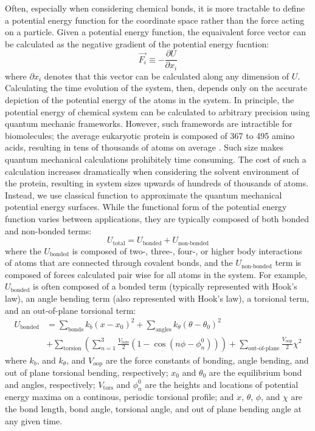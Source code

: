 Often, especially when considering chemical bonds, it is more tractable to define a potential energy function for the coordinate space rather than the force acting on a particle. 
Given a potential energy function, the equaivalent force vector can be calculated as the negative gradient of the potential energy fucntion: 
\begin{equation} 
    \vec{F_i} \equiv -\frac{\partial U}{\partial x_i}
\end{equation}
where $\partial x_i$ denotes that this vector can be calculated along any dimension of $U$. 
Calculating the time evolution of the system, then, depends only on the accurate depiction of the potential energy of the atoms in the system. 
In principle, the potential energy of chemical system can be calculated to arbitrary precision using quantum mechanic frameworks. 
However, such framewords are intractible for biomolecules; the average eukaryotic protein is composed of 367 to 495 amino acids, resulting in tens of thousands of atoms on average \cite{Kozlowski2017}. 
Such size makes quantum mechanical calculations prohibitely time consuming. 
The cost of such a calculation increases dramatically when considering the solvent environment of the protein, resulting in system sizes upwards of hundreds of thousands of atoms. 
Instead, we use classical function to approximate the quantum mechanical potential energy surfaces. 
While the functional form of the potential energy function varies between applications, they are typically composed of both bonded and non-bonded terms: 
\begin{equation}
    U_{\text{total}} = U_{\text{bonded}} + U_{\text{non-bonded}}
\end{equation}
where the $U_{\text{bonded}}$ is composed of two-, three-, four-, or higher body interactions of atoms that are connected through covalent bonds, and the $U_{\text{non-bonded}}$ term is composed of forces calculated pair wise for all atoms in the system. 
For example, $U_{\text{bonded}}$ is often composed of a bonded term (typically represented with Hook's law), an angle bending term (also represented with Hook's law), a torsional term, and an out-of-plane torsional term: 
\begin{equation}
    \begin{split}
        U_{\text{bonded}} &= \sum_{\text{bonds}} k_b(x-x_0)^2 + \sum_{\text{angles}} k_\theta (\theta - \theta_0)^2 \\
        &+ \sum_{\text{torsion}} \left ( \sum_{n = 1}^3 \frac{V_\text{tors}}{2} (1 - \cos (n \phi - \phi_n^0) ) \right ) + \sum_{\text{out-of-plane}} \frac{V_\text{oop}}{2} \chi^2
    \end{split}
    \label{eq:intro-bond}
\end{equation}
where $k_b$, and $k_\theta$, and $V_\text{oop}$ are the force constants of bonding, angle bending, and out of plane torsional bending, respectively; 
$x_0$ and $\theta_0$ are the equilibrium bond and angles, respectively; 
$V_\text{tors}$ and $\phi_n^0$ are the heights and locations of potential energy maxima on a continous, periodic torsional profile; 
and $x$, $\theta$, $\phi$, and $\chi$ are the bond length, bond angle, torsional angle, and out of plane bending angle at any given time. 

